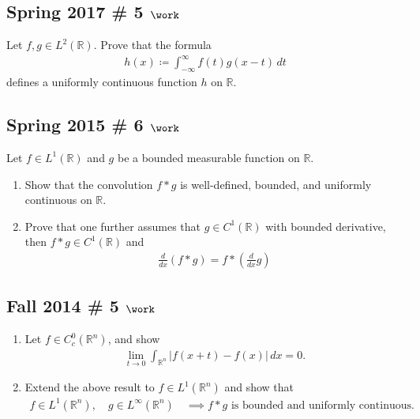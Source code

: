 \hypertarget{spring-2017-5-work}{%
\subsection{\texorpdfstring{Spring 2017 \# 5
\(\work\)}{Spring 2017 \# 5 \textbackslash work}}\label{spring-2017-5-work}}

Let \(f, g \in L^2({\mathbb{R}})\). Prove that the formula
\begin{align*}
h(x) \coloneqq\int _{-\infty}^{\infty} f(t) g(x-t) \, dt
\end{align*}
defines a uniformly continuous function \(h\) on \({\mathbb{R}}\).

\hypertarget{spring-2015-6-work}{%
\subsection{\texorpdfstring{Spring 2015 \# 6
\(\work\)}{Spring 2015 \# 6 \textbackslash work}}\label{spring-2015-6-work}}

Let \(f \in L^1({\mathbb{R}})\) and \(g\) be a bounded measurable
function on \({\mathbb{R}}\).

\begin{enumerate}
\def\labelenumi{\arabic{enumi}.}
\tightlist
\item
  Show that the convolution \(f\ast g\) is well-defined, bounded, and
  uniformly continuous on \({\mathbb{R}}\).
\item
  Prove that one further assumes that \(g \in C^1({\mathbb{R}})\) with
  bounded derivative, then \(f\ast g \in C^1({\mathbb{R}})\) and
  \begin{align*}
  \frac{d}{d x}(f * g)=f *\left(\frac{d}{d x} g\right)
  \end{align*}
\end{enumerate}

\hypertarget{fall-2014-5-work}{%
\subsection{\texorpdfstring{Fall 2014 \# 5
\(\work\)}{Fall 2014 \# 5 \textbackslash work}}\label{fall-2014-5-work}}

\begin{enumerate}
\def\labelenumi{\arabic{enumi}.}
\item
  Let \(f \in C_c^0({\mathbb{R}}^n)\), and show
  \begin{align*}
  \lim _{t \to 0} \int_{{\mathbb{R}}^n} |f(x+t) - f(x)| \, dx = 0
  .\end{align*}
\item
  Extend the above result to \(f\in L^1({\mathbb{R}}^n)\) and show that
  \begin{align*}
  f\in L^1({\mathbb{R}}^n), \quad g\in L^\infty({\mathbb{R}}^n) \quad
  \implies f \ast g \text{ is bounded and uniformly continuous. }
  \end{align*}
\end{enumerate}

